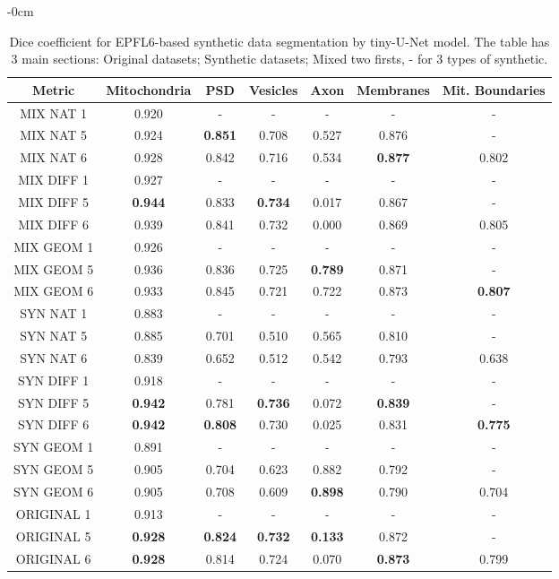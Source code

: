\documentclass[journal,article,submit,pdftex,moreauthors]{Definitions/mdpi}
\begin{document}
\begin{table}[H] 
	\caption{Dice coefficient for EPFL6-based synthetic data segmentation by tiny-U-Net model. The table has 3 main sections: Original datasets; Synthetic datasets; Mixed two firsts, - for 3 types of synthetic.}
	\begin{adjustwidth}{-\extralength}{0cm}
		{\fontsize{10pt}{10pt}\selectfont
		\begin{tabularx}{\fulllength}{CCCCCCC}
			\toprule
			\textbf{Metric} & \textbf{Mitochondria}	& \textbf{PSD}	& \textbf{Vesicles}	& \textbf{Axon}	& \textbf{Membranes}	& \textbf{Mit. Boundaries}\\
			\midrule
			MIX NAT 1 & 0.920 & - & - & - & - & -\\
			MIX NAT 5 & 0.924 & \textbf{0.851} & 0.708 & 0.527 & 0.876 & -\\
			MIX NAT 6 & 0.928 & 0.842 & 0.716 & 0.534 & \textbf{0.877} & 0.802\\
			MIX DIFF 1 & 0.927 & - & - & - & - & -\\
			MIX DIFF 5 & \textbf{0.944} & 0.833 & \textbf{0.734} & 0.017 & 0.867 & -\\
			MIX DIFF 6 & 0.939 & 0.841 & 0.732 & 0.000 & 0.869 & 0.805\\
			MIX GEOM 1 & 0.926 & - & - & - & - & -\\
			MIX GEOM 5 & 0.936 & 0.836 & 0.725 & \textbf{0.789} & 0.871 & -\\
			MIX GEOM 6 & 0.933 & 0.845 & 0.721 & 0.722 & 0.873 & \textbf{0.807}\\
			\midrule
			SYN NAT 1 & 0.883 & - & - & - & - & -\\
			SYN NAT 5 & 0.885 & 0.701 & 0.510 & 0.565 & 0.810 & -\\
			SYN NAT 6 & 0.839 & 0.652 & 0.512 & 0.542 & 0.793 & 0.638\\
			SYN DIFF 1 & 0.918 & - & - & - & - & -\\
			SYN DIFF 5 & \textbf{0.942} & 0.781 & \textbf{0.736} & 0.072 & \textbf{0.839} & -\\
			SYN DIFF 6 & \textbf{0.942} & \textbf{0.808} & 0.730 & 0.025 & 0.831 & \textbf{0.775}\\
			SYN GEOM 1 & 0.891 & - & - & - & - & -\\
			SYN GEOM 5 & 0.905 & 0.704 & 0.623 & 0.882 & 0.792 & -\\
			SYN GEOM 6 & 0.905 & 0.708 & 0.609 & \textbf{0.898} & 0.790 & 0.704\\
			\midrule
			ORIGINAL 1 & 0.913 & - & - & - & - & -\\
			ORIGINAL 5 & \textbf{0.928} & \textbf{0.824} & \textbf{0.732} & \textbf{0.133} & 0.872 & -\\
			ORIGINAL 6 & \textbf{0.928} & 0.814 & 0.724 & 0.070 & \textbf{0.873} & 0.799\\
			\bottomrule
		\end{tabularx}
		}
	\end{adjustwidth}
\end{table}
\end{document}
